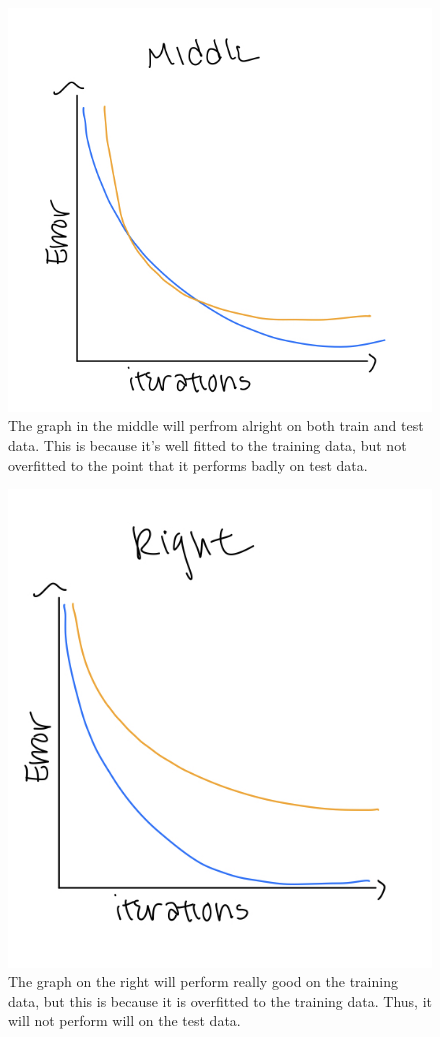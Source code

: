 \documentclass[12pt, letterpaper]{article}
\begin{document}
\begin{figure}[h!]
  \includegraphics[scale=0.33]{./images/1a_middle.jpg}
\caption*{The graph in the middle will perfrom alright on both train and test data. This is because it's well fitted to the training data, but not overfitted to the point that it performs badly on test data.}
\end{figure}
\begin{figure}[h!]
  \includegraphics[scale=0.33]{./images/1a_right.jpg}
\caption*{The graph on the right will perform really good on the training data, but this is because it is overfitted to the training data. Thus, it will not perform will on the test data.}
\end{figure}
\clearpage
\end{document}

